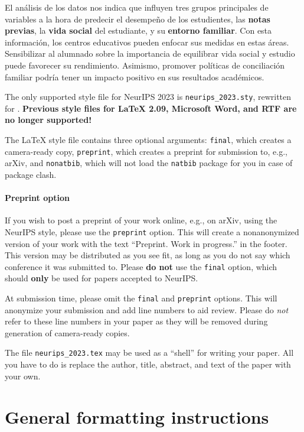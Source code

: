 \documentclass{article}
\begin{document}
El análisis de los datos nos indica que influyen tres grupos principales de variables a la hora de predecir el desempeño de los estudientes, las \textbf{notas previas}, la \textbf{vida social} del estudiante, y su \textbf{entorno familiar}.
Con esta información, los centros educativos pueden enfocar sus medidas en estas áreas. Sensibilizar al alumnado sobre la importancia de equilibrar vida social y estudio puede favorecer su rendimiento. Asimismo, promover políticas de 
conciliación familiar podría tener un impacto positivo en sus resultados académicos.

The only supported style file for NeurIPS 2023 is \verb+neurips_2023.sty+,
rewritten for \LaTeXe{}.  \textbf{Previous style files for \LaTeX{} 2.09,
  Microsoft Word, and RTF are no longer supported!}


The \LaTeX{} style file contains three optional arguments: \verb+final+, which
creates a camera-ready copy, \verb+preprint+, which creates a preprint for
submission to, e.g., arXiv, and \verb+nonatbib+, which will not load the
\verb+natbib+ package for you in case of package clash.


\paragraph{Preprint option}
If you wish to post a preprint of your work online, e.g., on arXiv, using the
NeurIPS style, please use the \verb+preprint+ option. This will create a
nonanonymized version of your work with the text ``Preprint. Work in progress.''
in the footer. This version may be distributed as you see fit, as long as you do not say which conference it was submitted to. Please \textbf{do
  not} use the \verb+final+ option, which should \textbf{only} be used for
papers accepted to NeurIPS. 


At submission time, please omit the \verb+final+ and \verb+preprint+
options. This will anonymize your submission and add line numbers to aid
review. Please do \emph{not} refer to these line numbers in your paper as they
will be removed during generation of camera-ready copies.


The file \verb+neurips_2023.tex+ may be used as a ``shell'' for writing your
paper. All you have to do is replace the author, title, abstract, and text of
the paper with your own.



\section{General formatting instructions}
\label{gen_inst}
\end{document}
